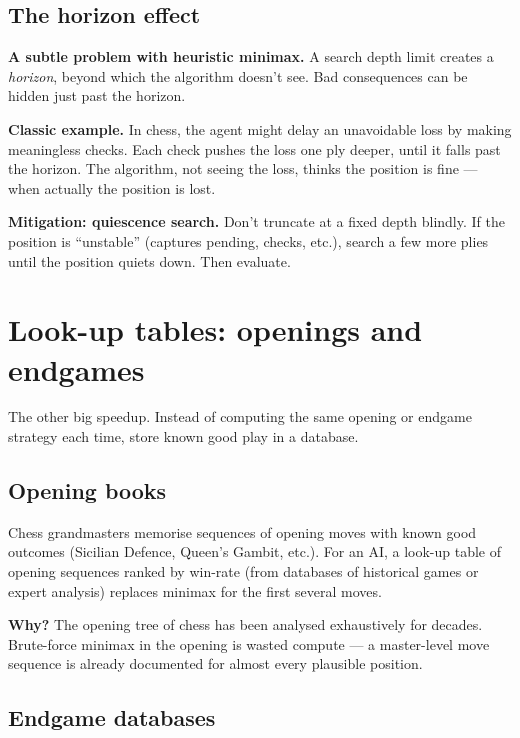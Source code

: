 \documentclass[11pt, a4paper]{article}
\begin{document}
\subsection{The horizon effect}

\textbf{A subtle problem with heuristic minimax.} A search depth limit creates a \emph{horizon}, beyond which the algorithm doesn't see. Bad consequences can be hidden just past the horizon.

\textbf{Classic example.} In chess, the agent might delay an unavoidable loss by making meaningless checks. Each check pushes the loss one ply deeper, until it falls past the horizon. The algorithm, not seeing the loss, thinks the position is fine — when actually the position is lost.

\textbf{Mitigation: quiescence search.} Don't truncate at a fixed depth blindly. If the position is ``unstable'' (captures pending, checks, etc.), search a few more plies until the position quiets down. Then evaluate.

\section{Look-up tables: openings and endgames}

The other big speedup. Instead of computing the same opening or endgame strategy each time, store known good play in a database.

\subsection{Opening books}

Chess grandmasters memorise sequences of opening moves with known good outcomes (Sicilian Defence, Queen's Gambit, etc.). For an AI, a look-up table of opening sequences ranked by win-rate (from databases of historical games or expert analysis) replaces minimax for the first several moves.

\textbf{Why?} The opening tree of chess has been analysed exhaustively for decades. Brute-force minimax in the opening is wasted compute — a master-level move sequence is already documented for almost every plausible position.

\subsection{Endgame databases}
\end{document}
